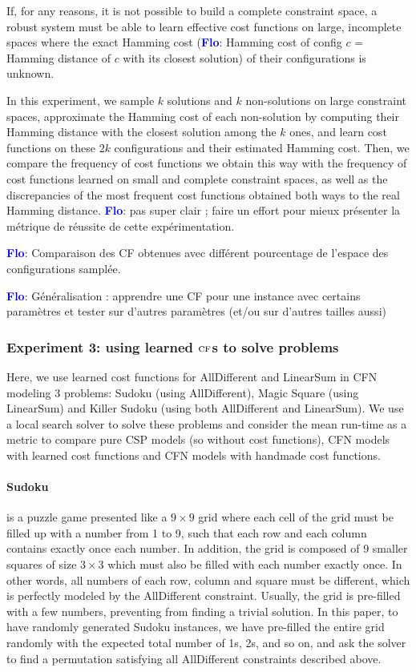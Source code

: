 \documentclass{article}
\newcommand{\csp}{\textsc{CSP}\xspace}
\newcommand{\cfn}{\textsc{CFN}\xspace}
\newcommand{\cf}{\textsc{cf}\xspace}
\newcommand{\flo}{\textcolor{blue}{\bf Flo}\xspace}
\begin{document}
If, for any reasons, it is not possible to build a complete constraint
space, a robust system must be  able to learn effective cost functions
on  large,  incomplete spaces  where  the  exact Hamming  cost  (\flo:
Hamming cost of config $c$ =  Hamming distance of $c$ with its closest
solution) of their configurations is unknown.

In this experiment,  we sample $k$ solutions and  $k$ non-solutions on
large  constraint  spaces,  approximate   the  Hamming  cost  of  each
non-solution  by computing  their  Hamming distance  with the  closest
solution among  the $k$ ones, and  learn cost functions on  these $2k$
configurations and their estimated Hamming  cost. Then, we compare the
frequency of cost  functions we obtain this way with  the frequency of
cost functions  learned on  small and  complete constraint  spaces, as
well as the discrepancies of the most frequent cost functions obtained
both ways to the real Hamming  distance. \flo: pas super clair ; faire
un  effort pour  mieux  présenter  la métrique  de  réussite de  cette
expérimentation. 

\flo:  Comparaison  des  CF  obtenues avec  différent  pourcentage  de
l'espace des configurations samplée.

\flo: Généralisation  : apprendre  une CF  pour une  instance avec  certains
paramètres  et  tester sur  d'autres  paramètres  (et/ou sur  d'autres
tailles aussi)

\subsubsection{Experiment 3: using learned $\cf$s to solve problems}

Here, we use learned cost  functions for AllDifferent and LinearSum in
\cfn modeling  3 problems:  Sudoku (using AllDifferent),  Magic Square
(using  LinearSum)  and Killer  Sudoku  (using  both AllDifferent  and
LinearSum). We use  a local search solver to solve  these problems and
consider the mean run-time as a metric to compare pure \csp models (so
without cost functions),  \cfn models with learned  cost functions and
\cfn models with handmade cost functions.

\paragraph{Sudoku} is a puzzle game presented like a $9 \times 9$ grid
where each cell of the grid must be  filled up with a number from 1 to
9,  such that  each row  and each  column contains  exactly once  each
number. In addition, the grid is composed of 9 smaller squares of size
$3  \times 3$  which  must also  be filled  with  each number  exactly
once. In other words, all numbers  of each row, column and square must
be  different,   which  is  perfectly  modeled   by  the  AllDifferent
constraint.   Usually, the  grid  is pre-filled  with  a few  numbers,
preventing from  finding a trivial  solution.  In this paper,  to have
randomly  generated Sudoku  instances, we  have pre-filled  the entire
grid randomly with the expected total number of 1s, 2s, and so on, and
ask  the solver  to  find a  permutation  satisfying all  AllDifferent
constraints described above.
\end{document}
